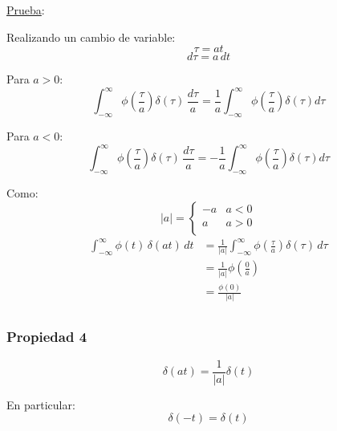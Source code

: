 \underline{Prueba}:

Realizando un cambio de variable:
\begin{equation*}
    \tau=at
\end{equation*}
\begin{equation*}
    d\tau=a\,dt
\end{equation*}

Para $a>0$:
\begin{equation*}
    \int_{-\infty}^{\infty}
        \phi\left(\frac{\tau}{a}\right)\delta(\tau)\,\frac{d\tau}{a}
        =\frac{1}{a}\int_{-\infty}^{\infty}
            \phi\left(\frac{\tau}{a}\right)\delta(\tau)d\tau
\end{equation*}

Para $a<0$:
\begin{equation*}
    \int_{-\infty}^{\infty}
        \phi\left(\frac{\tau}{a}\right)\delta(\tau)\,\frac{d\tau}{a}
        =-\frac{1}{a}\int_{-\infty}^{\infty}
            \phi\left(\frac{\tau}{a}\right)\delta(\tau)d\tau
\end{equation*}

Como:
\begin{equation*}
    |a|=\begin{cases}
        -a&a<0\\
        a&a>0\\
    \end{cases}
\end{equation*}
\begin{equation*}
\begin{split}
    \int_{-\infty}^{\infty}\phi(t)\,\delta(at)\,dt
        &=\frac{1}{|a|}\int_{-\infty}^{\infty}
            \phi\left(\frac{\tau}{a}\right)\delta(\tau)\,d\tau\\
        &=\frac{1}{|a|}\phi\left(\frac{0}{a}\right)\\
        &=\frac{\phi(0)}{|a|}\\
\end{split}
\end{equation*}

\subsubsection*{Propiedad 4}
\begin{equation}
    \delta(at)=\frac{1}{|a|}\delta(t)
\end{equation}

En particular:
\begin{equation}
    \delta(-t)=\delta(t)
\end{equation}

